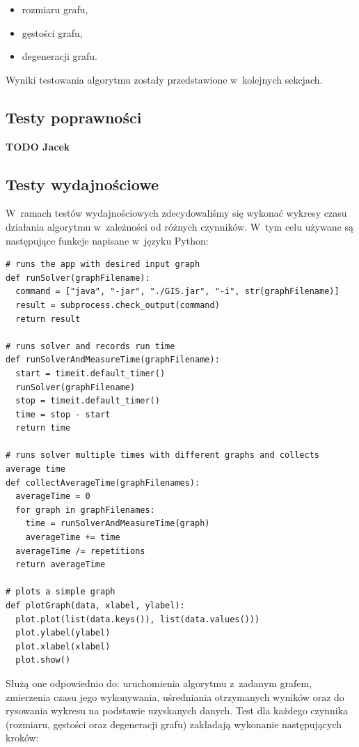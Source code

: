 \documentclass[11pt,a4paper]{article}
\begin{document}
\begin{itemize}
  \item rozmiaru grafu,
  \item gęstości grafu,
  \item degeneracji grafu.
\end{itemize}

Wyniki testowania algorytmu zostały przedstawione w~kolejnych sekcjach.

\subsection{Testy poprawności}
\textbf{TODO Jacek}

\newpage
\subsection{Testy wydajnościowe}
W~ramach testów wydajnościowych zdecydowaliśmy się wykonać wykresy czasu działania algorytmu w~zależności od różnych czynników. W~tym celu używane są następujące funkcje napisane w~języku Python:\\

\begin{lstlisting}[caption = Funkcje pomocnicze dla testów wydajnoćiowych]
# runs the app with desired input graph
def runSolver(graphFilename):
  command = ["java", "-jar", "./GIS.jar", "-i", str(graphFilename)]
  result = subprocess.check_output(command)
  return result

# runs solver and records run time
def runSolverAndMeasureTime(graphFilename):
  start = timeit.default_timer()
  runSolver(graphFilename)
  stop = timeit.default_timer()
  time = stop - start
  return time

# runs solver multiple times with different graphs and collects average time
def collectAverageTime(graphFilenames):
  averageTime = 0
  for graph in graphFilenames:
    time = runSolverAndMeasureTime(graph)
    averageTime += time
  averageTime /= repetitions
  return averageTime

# plots a simple graph
def plotGraph(data, xlabel, ylabel):
  plot.plot(list(data.keys()), list(data.values()))
  plot.ylabel(ylabel)
  plot.xlabel(xlabel)
  plot.show()
\end{lstlisting}

Służą one odpowiednio do: uruchomienia algorytmu z~zadanym grafem, zmierzenia czasu jego wykonywania, uśredniania otrzymanych wyników oraz do rysowania wykresu na podstawie uzyskanych danych. Test dla każdego czynnika (rozmiaru, gęstości oraz degeneracji grafu) zakładają wykonanie następujących kroków:
\end{document}
